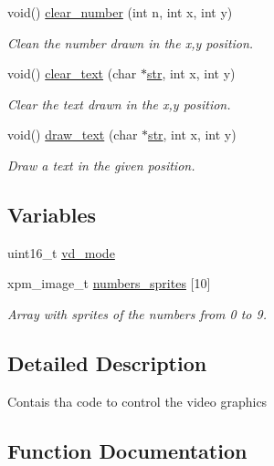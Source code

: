 \begin{DoxyCompactItemize}
void() \hyperlink{group__graphics_ga3a318192b1144825603071c57fdc4b8e}{clear\+\_\+number} (int n, int x, int y)
\begin{DoxyCompactList}\small\item\em Clean the number drawn in the x,y position. \end{DoxyCompactList}\item 
void() \hyperlink{group__graphics_ga51ea06097c3bf68f7963901b0296bde6}{clear\+\_\+text} (char $\ast$\hyperlink{group__Game-Over-Menu_gae3b2d5dad8a568a12752edcea2435e50}{str}, int x, int y)
\begin{DoxyCompactList}\small\item\em Clear the text drawn in the x,y position. \end{DoxyCompactList}\item 
void() \hyperlink{group__graphics_ga37cbb1079da920cd529418d4a9f83ff2}{draw\+\_\+text} (char $\ast$\hyperlink{group__Game-Over-Menu_gae3b2d5dad8a568a12752edcea2435e50}{str}, int x, int y)
\begin{DoxyCompactList}\small\item\em Draw a text in the given position. \end{DoxyCompactList}\end{DoxyCompactItemize}
\subsection*{Variables}
\begin{DoxyCompactItemize}
\item 
uint16\+\_\+t \hyperlink{group__graphics_ga505fdb0bbcbe5f0d3a5c4a3d1190401a}{vd\+\_\+mode}
\item 
xpm\+\_\+image\+\_\+t \hyperlink{group__graphics_ga5aa03a801f01a5140c299908a06c47cd}{numbers\+\_\+sprites} \mbox{[}10\mbox{]}
\begin{DoxyCompactList}\small\item\em Array with sprites of the numbers from 0 to 9. \end{DoxyCompactList}\end{DoxyCompactItemize}


\subsection{Detailed Description}
Contais tha code to control the video graphics 

\subsection{Function Documentation}
\mbox{\label{group__graphics_ga3a318192b1144825603071c57fdc4b8e}} 
